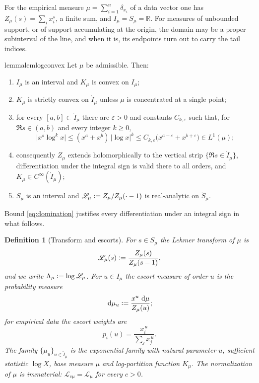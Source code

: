 \documentclass[sn-mathphys-num]{sn-jnl}
\theoremstyle{thmstyleone}%
\theoremstyle{thmstyletwo}%
\theoremstyle{thmstylethree}%
\newtheorem{definition}{Definition}%
\theoremstyle{thmstyleone}%
\providecommand{\R}{\mathbb{R}}
\providecommand{\Leh}{\mathscr{L}}
\providecommand{\dd}{\,\mathrm{d}}
\providecommand{\eqdef}{\mathrel{\vcentcolon=}}
\begin{document}
	For the empirical measure $\mu=\sum_{i=1}^n\delta_{x_i}$ of a data
	vector one has $Z_\mu(s)=\sum_ix_i^{s}$, a finite sum, and
	$I_\mu=S_\mu=\R$. For measures of unbounded support, or of support
	accumulating at the origin, the domain may be a proper subinterval of
	the line, and when it is, its endpoints turn out to carry the tail
	indices.
	
	\begin{restatable}[Regularity]{lemma}{lemlogconvex}\label{lem:logconvex}
		Let $\mu$ be admissible. Then:
		\begin{enumerate}[label=\textup{(\roman*)},leftmargin=2.2em]
			\item $I_\mu$ is an interval and $K_\mu$ is convex on $I_\mu$;
			\item $K_\mu$ is strictly convex on $\mathring I_\mu$ unless
			$\mu$ is concentrated at a single point;
			\item for every $[a,b]\subset\mathring I_\mu$ there are
			$\varepsilon>0$ and constants $C_{k,\varepsilon}$ such that,
			for $\Re s\in(a,b)$ and every integer $k\ge0$,
			\begin{equation}\label{eq:domination}
				\bigl|x^{s}\log^kx\bigr|
				\le(x^{a}+x^{b})\,|\log x|^{k}
				\le C_{k,\varepsilon}\bigl(x^{a-\varepsilon}
				+x^{b+\varepsilon}\bigr)\in L^1(\mu);
			\end{equation}
			\item consequently $Z_\mu$ extends holomorphically to the
			vertical strip $\{\Re s\in\mathring I_\mu\}$, differentiation
			under the integral sign is valid there to all orders, and
			$K_\mu\in C^\infty(\mathring I_\mu)$;
			\item $S_\mu$ is an interval and $\Leh_\mu\eqdef
			Z_\mu/Z_\mu(\cdot-1)$ is real-analytic on $\mathring S_\mu$.
		\end{enumerate}
	\end{restatable}
	
	Bound \eqref{eq:domination} justifies every differentiation under an
	integral sign in what follows.
	
	\begin{definition}[Transform and escorts]\label{def:L}
		For $s\in S_\mu$ the \emph{Lehmer transform} of $\mu$ is
		\begin{equation}\label{eq:defL}
			\Leh_\mu(s)\eqdef\frac{Z_\mu(s)}{Z_\mu(s-1)} ,
		\end{equation}
		and we write $\Lambda_\mu\eqdef\log\Leh_\mu$. For $u\in I_\mu$ the
		\emph{escort measure} of order $u$ is the probability measure
		\begin{equation}\label{eq:defescort}
			\dd\mu_u\eqdef\frac{x^{u}\,\dd\mu}{Z_\mu(u)} ;
		\end{equation}
		for empirical data the escort weights are
		\begin{equation}\label{eq:escortweights}
			p_i(u)=\frac{x_i^{\,u}}{\sum_jx_j^{\,u}} .
		\end{equation}
		The family $\{\mu_u\}_{u\in\mathring I_\mu}$ is the exponential
		family with natural parameter $u$, sufficient statistic $\log X$,
		base measure $\mu$ and log-partition function $K_\mu$. The
		normalization of $\mu$ is immaterial:
		$\Leh_{c\mu}=\Leh_\mu$ for every $c>0$.
	\end{definition}
	
\end{document}

